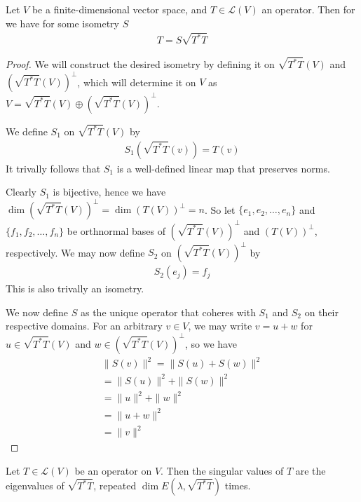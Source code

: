 \documentclass[]{article}
\begin{document}
\begin{thm} 
		Let $V$ be a finite-dimensional vector space, and $T \in \mathcal{L}(V)$ an operator. Then for we have for some isometry $S$ 
		\begin{align*}
				T = S \sqrt{T^*T}
		\end{align*}
\end{thm}

\begin{proof}
		We will construct the desired isometry by defining it on $\sqrt{T^*T}(V)$ and $(\sqrt{T^*T}(V))^{\perp}$, which will determine it on $V$ as $V = \sqrt{T^*T}(V) \oplus (\sqrt{T^*T}(V))^{\perp}$.

		We define $S_1$ on $\sqrt{T^*T}(V)$ by 
		\begin{align*}
				S_1(\sqrt{T^*T}(v)) = T(v)
		\end{align*}
		It trivally follows that $S_1$ is a well-defined linear map that preserves norms.

		Clearly $S_1$ is bijective, hence we have $\dim(\sqrt{T^*T}(V))^{\perp} = \dim(T(V))^{\perp} = n$. So let $\{e_1,e_2,\ldots,e_n\}$ and $\{f_1,f_2,\ldots,f_n\}$ be orthnormal bases of $(\sqrt{T^*T}(V))^{\perp}$ and $(T(V))^{\perp}$, respectively. We may now define $S_2$ on $(\sqrt{T^*T}(V))^{\perp}$ by 
		\begin{align*}
				S_2(e_j) = f_j
		\end{align*}
		This is also trivally an isometry.

		We now define $S$ as the unique operator that coheres with $S_1$ and $S_2$ on their respective domains. For an arbitrary $v \in V$, we may write $v = u + w$ for $u \in \sqrt{T^*T}(V)$ and $w \in (\sqrt{T^*T}(V))^{\perp}$, so we have
		\begin{align*}
				\|S(v)\|^2 = \|S(u) + S(w)\|^2 \\
				= \|S(u)\|^2 + \|S(w)\|^2 \\
				= \|u\|^2 + \|w\|^2 \\
				= \|u + w\|^2 \\
				= \|v\|^2
		\end{align*}
\end{proof}

\begin{defi} 
		Let $T \in \mathcal{L}(V)$ be an operator on $V$. Then the singular values of $T$ are the eigenvalues of $\sqrt{T^*T}$, repeated $\dim E(\lambda, \sqrt{T^*T})$ times.	
\end{defi}
\end{document}
